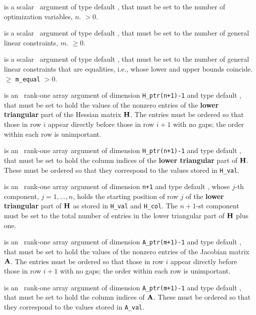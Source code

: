 \documentclass{galahad}
\begin{document}
\begin{description}
 is a scalar \intentin\ argument of type default \integer,
 that must be set  to the number of optimization variables, $n$.
 $> 0$.

 is a scalar \intentin\ argument of type default \integer,
 that must be set to the number of general linear constraints, $m$.
 $\geq 0$.

 is a scalar \intentin\ argument of type default \integer,
 that must be set to the number of general linear constraints that
 are equalities, i.e., whose lower and upper bounds coincide.
 $\geq$ {\tt m\_equal} $> 0$.

 is an \intentin\  rank-one array argument
of dimension {\tt H\_ptr(n+1)-1} and type default \realdp, that must be set
to hold the values of the nonzero entries of the {\bf lower triangular} part
of the Hessian matrix ${\mathbf{H}}$. The entries must be ordered so that those
in row $i$ appear directly before those in row $i+1$ with no gaps;
the order within each row is unimportant.

 is an \intentin\ rank-one array argument
of dimension {\tt H\_ptr(n+1)-1} and type default \integer, that must be set
to hold the column indices of the {\bf lower triangular} part of
${\mathbf{H}}$. These must be ordered so that they correspond to the values stored
in {\tt H\_val}.

 is an \intentin\ rank-one array argument
of dimension {\tt n+1} and type default \integer,
whose $j$-th component, $j = 1, \ldots , n$, holds the
starting position of row $j$ of the {\bf lower triangular} part of
${\mathbf{H}}$ as stored in {\tt H\_val} and {\tt H\_col}. The $n+1$-st
component must be set to the total number of entries in the lower
triangular part of ${\mathbf{H}}$ plus one.

 is an \intentin\  rank-one array argument
of dimension {\tt A\_ptr(m+1)-1} and type default \realdp, that must be set
to hold the values of the nonzero entries
of the Jacobian matrix ${\mathbf{A}}$. The entries must be ordered so that those
in row $i$ appear directly before those in row $i+1$ with no gaps;
the order within each row is unimportant.

 is an \intentin\ rank-one array argument
of dimension {\tt A\_ptr(m+1)-1} and type default \integer, that must be set
to hold the column indices of ${\mathbf{A}}$. These must be ordered so that they
correspond to the values stored in {\tt A\_val}.


\end{description}
\end{document}
